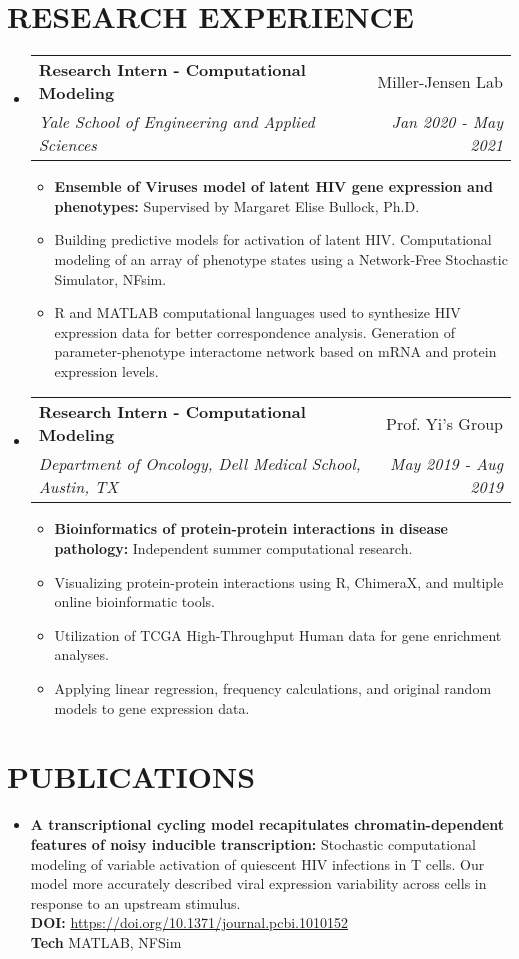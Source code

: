 \documentclass[a4paper,20pt]{article}
\makeatletter
\newcommand{\resumeItem}[2]{
  \item\small{
    \textbf{#1}{#2 \vspace{-3pt}}
  }
}
\newcommand{\resumeSubheading}[4]{
  \vspace{2pt}\item[]
    \begin{tabular*}{0.97\textwidth}{l@{\extracolsep{\fill}}r}
      \textbf{#1} & #2 \\
      \textit{#3} & \textit{#4} \\
    \end{tabular*}\vspace{-2pt}
}
\newcommand{\resumeSubItem}[2]{\resumeItem{#1}{#2}\vspace{-5pt}}
\newcommand{\resumeSubHeadingListStart}{\begin{itemize}[leftmargin=*]}
\newcommand{\resumeSubHeadingListEnd}{\end{itemize}}
\newcommand{\resumeItemListStart}{\begin{itemize}}
\newcommand{\resumeItemListEnd}{\end{itemize}\vspace{-5pt}}
\makeatother
\begin{document}
\section{\textbf{RESEARCH EXPERIENCE}}
  \resumeSubHeadingListStart
    \resumeSubheading{Research Intern - Computational Modeling}{Miller-Jensen Lab}
    {Yale School of Engineering and Applied Sciences}{Jan 2020 - May 2021}
    \resumeItemListStart
        \resumeItem{Ensemble of Viruses model of latent HIV gene expression and phenotypes:}{ Supervised by Margaret Elise Bullock, Ph.D.}
          \resumeItem{}{Building predictive models for activation of latent HIV. Computational modeling of an array of phenotype states using a
Network-Free Stochastic Simulator, NFsim.}
          \resumeItem{}{R and MATLAB computational languages used to synthesize HIV expression data for better correspondence analysis. Generation of parameter-phenotype interactome network based on mRNA and protein expression levels.}
      \resumeItemListEnd
    \resumeSubheading
		{Research Intern - Computational Modeling}{Prof. Yi's Group}
		{Department of Oncology, Dell Medical School, Austin, TX}{May 2019 -  Aug 2019}
		\resumeItemListStart
        \resumeItem{Bioinformatics of protein-protein interactions in disease pathology:}{ Independent summer computational research.}
          \resumeItem{}{Visualizing protein-protein interactions using R, ChimeraX, and multiple online bioinformatic tools.}
          \resumeItem{}{Utilization of TCGA High-Throughput Human data for gene enrichment analyses.}
          \resumeItem{}{Applying linear regression, frequency calculations, and original random models to gene expression data.}
		\resumeItemListEnd
  \resumeSubHeadingListEnd

\vspace{2pt}
\section{\textbf{PUBLICATIONS}}
\resumeSubHeadingListStart
\vspace{2pt}
\resumeSubItem{A transcriptional cycling model recapitulates chromatin-dependent features of noisy inducible transcription: }{ Stochastic computational modeling of variable activation of quiescent HIV infections in T cells. Our model more accurately described viral expression variability across cells in response to an upstream stimulus. \\\textbf{DOI:} \href{https://doi.org/10.1371/journal.pcbi.1010152}{https://doi.org/10.1371/journal.pcbi.1010152} 
\\\vspace{2pt}\textbf{Tech} MATLAB, NFSim}
\resumeSubHeadingListEnd
\end{document}
